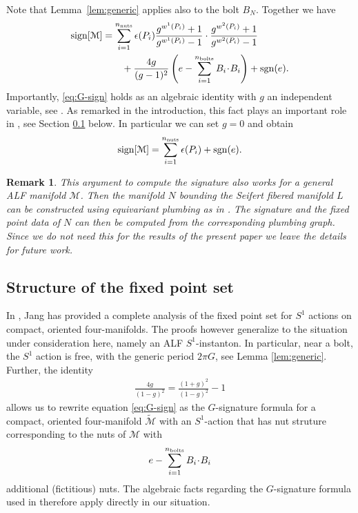 \documentclass[a4paper,10pt,reqno]{amsart}
\newcommand{\nut}{P}
\newcommand{\bolt}{B}
\newcommand{\sgn}{\mathop{\rm sgn}}
\newcommand{\sign}{\mathop{\rm sign}}
\newcommand{\cM}{\mathcal{M}}
\theoremstyle{plain}
\newtheorem{remark}[thm]{Remark}
\newcommand{\nnuts}{n_{\text{\rm nuts}}}
\newcommand{\nbolts}{n_{\text{\rm bolts}}}
\numberwithin{equation}{section}
\begin{document}
Note that Lemma~\ref{lem:generic} applies also to the bolt $B_N$. Together we have 
\begin{align} \label{eq:G-sign}
\sign[\cM] 
&= 
\sum_{i=1}^{\nnuts} \epsilon(\nut_i) 
\frac{g^{w^1(\nut_i)} + 1}{g^{w^1(\nut_i)} - 1} \cdot 
\frac{g^{w^2(\nut_i)} + 1}{g^{w^2(\nut_i)} - 1} \nonumber \\
&\qquad
+ \frac{4g}{(g-1)^2} \left( e - \sum_{i=1}^{\nbolts} B_i \!\cdot\! B_i \right) 
+ \sgn(e).
\end{align}
%
Importantly,  \eqref{eq:G-sign} holds as an algebraic identity with $g$ an independent variable, see \cite[\S 5.8]{HirzebruchBergerJung}. As remarked in the introduction, this fact plays an important role in \cite{2018JGP...133..181J}, see Section \ref{sec:fps} below. In particular we can set $g=0$ and obtain  
\begin{align} \label{eq:G-sign-g0}
\sign[\cM] = \sum_{i=1}^{\nnuts} \epsilon(\nut_i) + \sgn(e) .
\end{align} 

\begin{remark}
This argument to compute the signature also works for a general ALF manifold $\cM$. Then the manifold $N$ bounding the Seifert fibered manifold $L$ can be constructed using equivariant plumbing as in \cite[Chapter~2]{Orlik-seifert-manifolds}. The signature and the fixed point data of $N$ can then be computed from the corresponding plumbing graph. Since we do not need this for the results of the present paper we leave the details for future work.
\end{remark}

\subsection{Structure of the fixed point set} \label{sec:fps}
In \cite{2018JGP...133..181J}, Jang has provided a complete analysis of the fixed point set for $S^1$ actions on compact, oriented four-manifolds. The proofs however generalize to the situation under consideration here, namely an ALF $S^1$-instanton. In particular, near a bolt, the $S^1$ action is free, with the generic period $2\pi G$, see Lemma \ref{lem:generic}. Further, the identity 
\begin{align} 
\frac{4g}{(1-g)^2} = \frac{(1+g)^2}{(1-g)^2} - 1
\end{align} 
allows us to rewrite equation \eqref{eq:G-sign} as the $G$-signature formula for a compact, oriented four-manifold $\tilde{\cM}$ with an $S^1$-action that has nut struture corresponding to the nuts of $\cM$ with 
\begin{align} 
e-\sum_{i=1}^{\nbolts} \bolt_i \!\cdot\! \bolt_i
\end{align} 
additional (fictitious) nuts. The algebraic facts regarding the $G$-signature formula used in \cite{2018JGP...133..181J} therefore apply directly in our situation. 
\end{document}
